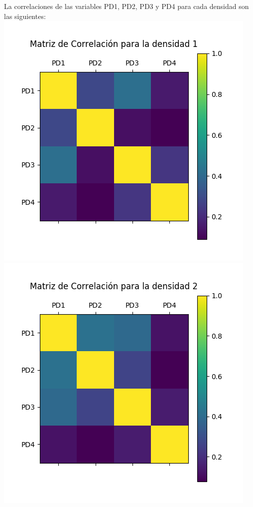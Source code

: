 La correlaciones de las variables PD1, PD2, PD3 y PD4 para cada densidad son las siguientes:
\includegraphics[scale=0.5]{correlacionD1.jpg} 
\includegraphics[scale=0.5]{correlacionD2.jpg} \\
